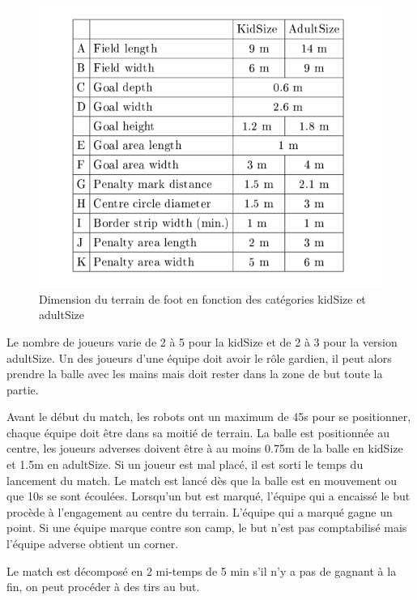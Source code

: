 \documentclass[11pt, a4paper]{article}
\begin{document}
\begin{figure}[H]
	\centering
	\includegraphics[scale=0.8]{images/dim_ter.PNG}
	\caption {\cite{robocuprules}
		Dimension du terrain de foot en fonction des catégories kidSize et adultSize}
	\label{fig:dim_ter}
\end{figure}
Le nombre de joueurs varie de 2 à 5 pour la kidSize et de 2 à 3 pour la version adultSize. Un des joueurs d'une équipe doit avoir le rôle gardien, il peut alors prendre la balle avec les mains mais doit rester dans la zone de but toute la partie.
\newline

Avant le début du match, les robots ont un maximum de 45s pour se positionner, chaque équipe doit être dans sa moitié de terrain. La balle est positionnée au centre, les joueurs adverses doivent être à au moins 0.75m de la balle en kidSize et 1.5m en adultSize. Si un joueur est mal placé, il est sorti le temps du lancement du match. Le match est lancé dès que la balle est en mouvement ou que 10s se sont écoulées.
\newline
Lorsqu'un but est marqué, l'équipe qui a encaissé le but procède à l'engagement au centre du terrain. L'équipe qui a marqué gagne un point. Si une équipe marque contre son camp, le but n'est pas comptabilisé mais l'équipe adverse obtient un corner.\newline

Le match est décomposé en 2 mi-temps de 5 min s'il n'y a pas de gagnant à la fin, on peut procéder à des tirs au but.\newline
\end{document}
